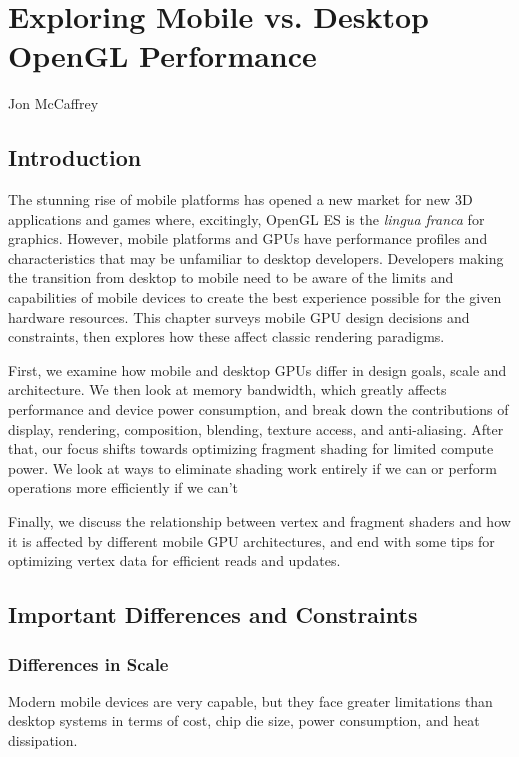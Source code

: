 \chapter{Exploring Mobile vs. Desktop OpenGL Performance}{Jon McCaffrey}
\label{Exploring-Mobile-vs-Desktop-OpenGL-Performance}

\section{Introduction}

The stunning rise of mobile platforms has opened a new market for new 3D
applications and games where, excitingly, OpenGL ES is the \textit{lingua
franca} for graphics. However, mobile platforms and GPUs have performance
profiles and characteristics that may be unfamiliar to desktop developers.
Developers making the transition from desktop to mobile need to be aware of
the limits and capabilities of mobile devices to create the best experience
possible for the given hardware resources.  This chapter surveys mobile GPU
design decisions and constraints, then explores how these affect classic
rendering paradigms.

First, we examine how mobile and desktop GPUs differ in design goals, scale and
architecture.  We then look at memory bandwidth, which greatly
affects performance and device power consumption, and break down the contributions
of display, rendering, composition, blending, texture access, and anti-aliasing.  After
that, our focus shifts towards optimizing fragment shading for limited compute
power.  We look at ways to eliminate shading work entirely if we can or 
perform operations more efficiently if we can't

Finally, we discuss the relationship between vertex and fragment shaders and
how it is affected by different mobile GPU architectures, and end with some
tips for optimizing vertex data for efficient reads and updates.

\section{Important Differences and Constraints}\label{Jon-McCaffrey:Constraints-Inspire-Creativity}

\subsection{Differences in Scale}
\label{Jon-McCaffrey:Architectural-Differences} Modern mobile devices are
very capable, but they face greater limitations than desktop systems in
terms of cost, chip die size, power consumption, and heat dissipation.


